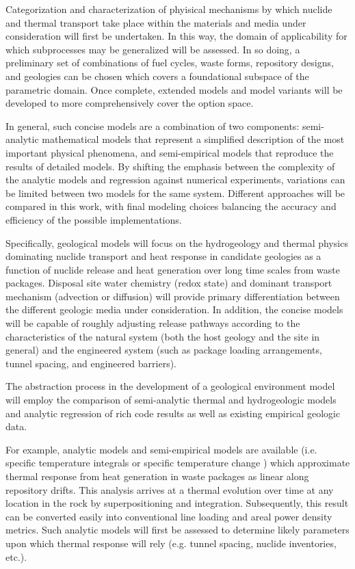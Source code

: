 Categorization and characterization of phyisical mechanisms by which 
nuclide and thermal transport take place within the materials and 
media under consideration will first be undertaken. In this way, the 
domain of applicability for which subprocesses may be generalized will 
be assessed. In so doing, a preliminary set of combinations of fuel 
cycles, waste forms, repository designs, and geologies can be chosen 
which covers a foundational subspace of the parametric domain. Once 
complete, extended models and model variants will be developed to more 
comprehensively cover the option space.  

In general, such concise models are a combination of two components: 
semi-analytic mathematical models that represent a simplified 
description of the most important physical phenomena, and 
semi-empirical models that reproduce the results of detailed models.  
By shifting the emphasis between the complexity of the analytic models 
and regression against numerical experiments, variations can be 
limited between two models for the same system.  Different approaches 
will be compared in this work, with final modeling choices balancing 
the accuracy and efficiency of the possible implementations.  

Specifically, geological models will focus on the hydrogeology and 
thermal physics dominating nuclide transport and heat response in 
candidate geologies as a function of nuclide release and heat 
generation over long time scales from waste packages.  Disposal site 
water chemistry (redox state) and dominant transport mechanism 
(advection or diffusion) will provide primary differentiation between 
the different geologic media under consideration. In addition, the 
concise models will be capable of roughly adjusting release pathways 
according to the characteristics of the natural system (both the host 
geology and the site in general) and the engineered system (such as 
package loading arrangements, tunnel spacing, and engineered 
barriers).

The abstraction process in the development of a geological environment 
model will employ the comparison of semi-analytic thermal and 
hydrogeologic models and analytic regression of rich code results as 
well as existing empirical geologic data.  

For example, analytic models and semi-empirical models are available 
(i.e. specific temperature integrals \cite{li_methodology_2006} or 
specific temperature change \cite{radel_effect_2007}) which 
approximate thermal response from heat generation in waste packages as 
linear along repository drifts. This analysis arrives at a thermal 
evolution over time at any location in the rock by superpositioning 
and integration. Subsequently, this result can be converted easily 
into conventional line loading and areal power density metrics.  Such 
analytic models will first be assessed to determine likely parameters 
upon which thermal response will rely (e.g. tunnel spacing, nuclide 
inventories, etc.).

